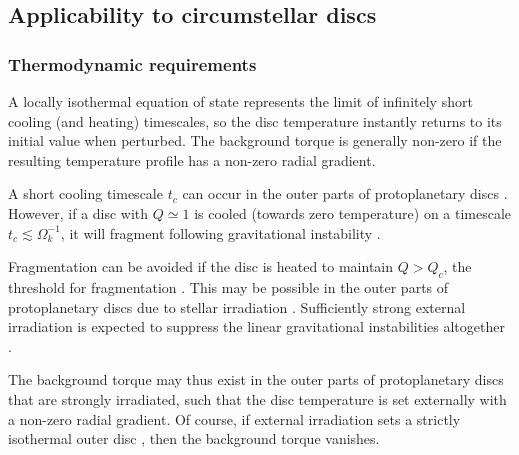 {\bf
  \subsection{Applicability to circumstellar discs}
  
  \subsubsection{Thermodynamic requirements}  

  A locally isothermal equation of state represents the limit
  of infinitely short cooling (and heating) timescales, so the 
  disc temperature instantly returns to its initial value when 
  perturbed. The background torque is generally non-zero if the 
  resulting temperature profile has a non-zero radial gradient.  
  
  A short cooling timescale $t_c$ can occur in the outer
  parts of protoplanetary discs 
  \citep{rafikov05,clarke09,rice09,cossins10b}.  %
  However, if a disc with $Q\simeq 1$ is cooled (towards zero
  temperature) on a timescale $t_c\lesssim\Omega_k^{-1}$, it will
  fragment following gravitational instability
  \citep{gammie01,rice05,paardekooper12}.  
  
  Fragmentation can be avoided if the disc is heated to maintain 
  $Q>Q_c$, the threshold for fragmentation \citep[$Q_c\simeq
  1.4$ for isothermal discs,][]{mayer04}. This may be 
  possible in the outer parts of protoplanetary discs due to
  stellar irradiation \citep{rafikov09,zhu12}. Sufficiently strong
  external irradiation is expected to suppress the linear gravitational
  instabilities altogether \citep{rice11}.  

  The background torque may thus exist in the outer
  parts of protoplanetary discs that are strongly irradiated, such
  that the disc temperature is set externally with a non-zero radial
  gradient. Of course, if external irradiation sets a strictly
  isothermal outer disc \citep[e.g.][]{boley09}, then the background
  torque vanishes.      

}
